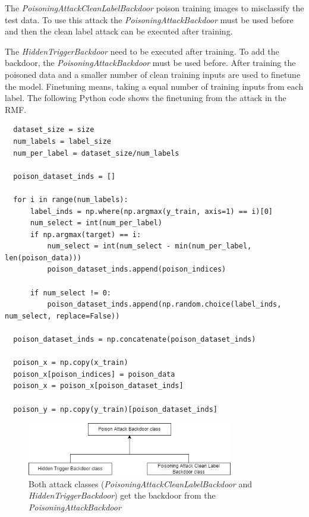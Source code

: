 The \textit{PoisoningAttackCleanLabelBackdoor} poison training images to misclassify the test data. To use this attack the \textit{PoisoningAttackBackdoor} must be used before and then the clean label attack can be executed after training.

The \textit{HiddenTriggerBackdoor} need to be executed after training. To add the backdoor, the \textit{PoisoningAttackBackdoor} must be used before. After training the poisoned data and a smaller number of clean training inputs are used to finetune the model. Finetuning means, taking a equal number of training inputs from each label. The following Python code shows the finetuning from the attack in the RMF.

\begin{lstlisting}
  dataset_size = size
  num_labels = label_size
  num_per_label = dataset_size/num_labels

  poison_dataset_inds = []

  for i in range(num_labels):
      label_inds = np.where(np.argmax(y_train, axis=1) == i)[0]
      num_select = int(num_per_label)
      if np.argmax(target) == i:
          num_select = int(num_select - min(num_per_label, len(poison_data)))
          poison_dataset_inds.append(poison_indices)

      if num_select != 0:
          poison_dataset_inds.append(np.random.choice(label_inds, num_select, replace=False))

  poison_dataset_inds = np.concatenate(poison_dataset_inds)

  poison_x = np.copy(x_train)
  poison_x[poison_indices] = poison_data
  poison_x = poison_x[poison_dataset_inds]

  poison_y = np.copy(y_train)[poison_dataset_inds]
\end{lstlisting}

\begin{figure}[ht!]
  \centering
  \includegraphics[width=9cm]{pictures/attack_relationship.png}
  \caption{Both attack classes (\textit{PoisoningAttackCleanLabelBackdoor} and \textit{HiddenTriggerBackdoor}) get the backdoor from the \textit{PoisoningAttackBackdoor}}
  \label{fig:relation_risk_ind}
\end{figure}

